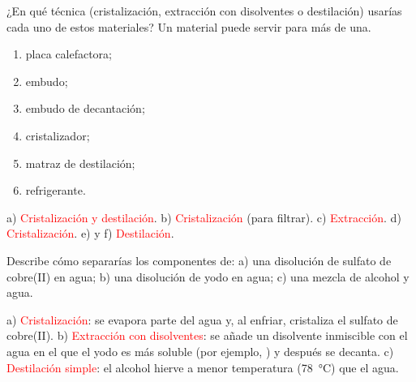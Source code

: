 \begin{exercise}
    ¿En qué técnica (cristalización, extracción con disolventes o destilación) usarías cada uno de estos materiales? Un material puede servir para más de una.
    \begin{enumerate}[label=\alph*)]
        \item placa calefactora;
        \item embudo;
        \item embudo de decantación;
        \item cristalizador;
        \item matraz de destilación;
        \item refrigerante.
    \end{enumerate}
    \begin{solu}
        a) \textcolor{red}{Cristalización y destilación}. b) \textcolor{red}{Cristalización} (para filtrar). c) \textcolor{red}{Extracción}. d) \textcolor{red}{Cristalización}. e) y f) \textcolor{red}{Destilación}.
    \end{solu}
\end{exercise}

\begin{exercise}
    Describe cómo separarías los componentes de: a) una disolución de sulfato de cobre(II) en agua; b) una disolución de yodo en agua; c) una mezcla de alcohol y agua.
    \begin{solu}
        a) \textcolor{red}{Cristalización}: se evapora parte del agua y, al enfriar, cristaliza el sulfato de cobre(II). b) \textcolor{red}{Extracción con disolventes}: se añade un disolvente inmiscible con el agua en el que el yodo es más soluble (por ejemplo, ) y después se decanta. c) \textcolor{red}{Destilación simple}: el alcohol hierve a menor temperatura (\qty{78}{\celsius}) que el agua.
    \end{solu}
\end{exercise}
